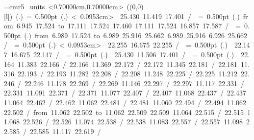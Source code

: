 \font\thinlinefont=cmr5
%
\begingroup\makeatletter\ifx\SetFigFont\undefined%
\gdef\SetFigFont#1#2#3#4#5{%
  \reset@font\fontsize{#1}{#2pt}%
  \fontfamily{#3}\fontseries{#4}\fontshape{#5}%
  \selectfont}%
\fi\endgroup%
\mbox{\beginpicture
\setcoordinatesystem units <0.70000cm,0.70000cm>
\unitlength=0.50000cm
\linethickness=1pt
\setplotsymbol ({\makebox(0,0)[l]{\tencirc{}}})
\setshadesymbol ({\thinlinefont .})
\setlinear
%
%
\linethickness= 0.500pt
\setplotsymbol ({\thinlinefont .})
\setdots < 0.0953cm>
{\color[rgb]{0,0,0} 25.430 11.419 17.401 /
}%
%
%
\linethickness= 0.500pt
\setplotsymbol ({\thinlinefont .})
\setsolid
{\color[rgb]{0,0,0}\putrule from  6.945 17.524 to 17.111 17.524
%
%
 17.460 17.111 17.524 16.857 17.587 /
%
}%
%
%
\linethickness= 0.500pt
\setplotsymbol ({\thinlinefont .})
{\color[rgb]{0,0,0}\putrule from  6.989 17.524 to  6.989 25.916
%
%
 25.662  6.989 25.916  6.926 25.662 /
%
}%
%
%
\linethickness= 0.500pt
\setplotsymbol ({\thinlinefont .})
\setdots < 0.0953cm>
{\color[rgb]{0,0,0} 22.255 16.675 22.255 /
}%
%
%
\linethickness= 0.500pt
\setplotsymbol ({\thinlinefont .})
{\color[rgb]{0,0,0} 22.147 16.675 22.147 /
}%
%
%
\linethickness= 0.500pt
\setplotsymbol ({\thinlinefont .})
{\color[rgb]{0,0,0} 25.430 11.506 17.401 /
}%
%
%
\linethickness= 0.500pt
\setplotsymbol ({\thinlinefont .})
\setsolid
{\color[rgb]{0,0,0} 22.164 11.383 22.166 /
 22.166 11.369 22.172 /
 22.172 11.345 22.181 /
 22.181 11.316 22.193 /
 22.193 11.282 22.208 /
 22.208 11.248 22.225 /
 22.225 11.212 22.246 /
 22.246 11.178 22.269 /
 22.269 11.146 22.297 /
 22.297 11.117 22.331 /
 22.331 11.091 22.371 /
 22.371 11.077 22.407 /
 22.407 11.068 22.437 /
 22.437 11.064 22.462 /
 22.462 11.062 22.481 /
 22.481 11.060 22.494 /
 22.494 11.062 22.502 /
\putrule from 11.062 22.502 to 11.062 22.509
 22.509 11.064 22.515 /
 22.515 11.068 22.526 /
 22.526 11.074 22.538 /
 22.538 11.083 22.557 /
 22.557 11.098 22.585 /
 22.585 11.117 22.619 /
}}
